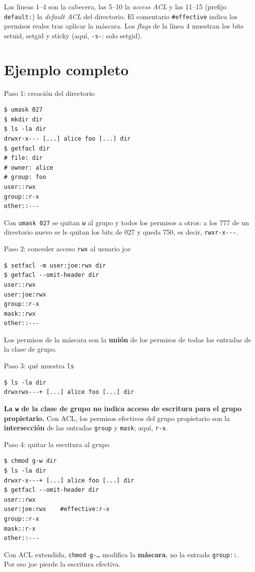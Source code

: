 \documentclass[11pt,a4paper]{report}
\newcommand{\destacar}[1]{\textcolor{red!70!black}{\textbf{#1}}}
\begin{document}
Las líneas 1--4 son la cabecera, las 5--10 la \emph{access ACL} y las 11--15 (prefijo \texttt{default:}) la \emph{default ACL} del directorio. El comentario \texttt{\#effective} indica los permisos reales tras aplicar la máscara. Los \emph{flags} de la línea 4 muestran los bits setuid, setgid y sticky (aquí, \texttt{-s-}: solo setgid).
 
\section{Ejemplo completo}
 
\begin{ejemplo}{Paso 1: creación del directorio}
\begin{verbatim}
$ umask 027
$ mkdir dir
$ ls -la dir
drwxr-x--- [...] alice foo [...] dir
$ getfacl dir
# file: dir
# owner: alice
# group: foo
user::rwx
group::r-x
other::---
\end{verbatim}
Con \texttt{umask 027} se quitan \texttt{w} al grupo y todos los permisos a otros: a los 777 de un directorio nuevo se le quitan los bits de 027 y queda 750, es decir, \texttt{rwxr-x-{}-{}-}.
\end{ejemplo}
 
\begin{ejemplo}{Paso 2: conceder acceso \texttt{rwx} al usuario joe}
\begin{verbatim}
$ setfacl -m user:joe:rwx dir
$ getfacl --omit-header dir
user::rwx
user:joe:rwx
group::r-x
mask::rwx
other::---
\end{verbatim}
Los permisos de la máscara son la \textbf{unión} de los permisos de todas las entradas de la clase de grupo.
\end{ejemplo}
 
\begin{ejemplo}{Paso 3: qué muestra \texttt{ls}}
\begin{verbatim}
$ ls -la dir
drwxrwx---+ [...] alice foo [...] dir
\end{verbatim}
\destacar{La \texttt{w} de la clase de grupo no indica acceso de escritura para el grupo propietario.} Con ACL, los permisos efectivos del grupo propietario son la \textbf{intersección} de las entradas \texttt{group} y \texttt{mask}; aquí, \texttt{r-x}.
\end{ejemplo}
 
\begin{ejemplo}{Paso 4: quitar la escritura al grupo}
\begin{verbatim}
$ chmod g-w dir
$ ls -la dir
drwxr-x---+ [...] alice foo [...] dir
$ getfacl --omit-header dir
user::rwx
user:joe:rwx    #effective:r-x
group::r-x
mask::r-x
other::---
\end{verbatim}
Con ACL extendida, \texttt{chmod g-\ldots} modifica la \textbf{máscara}, no la entrada \texttt{group::}. Por eso joe pierde la escritura efectiva.
\end{ejemplo}
 
\end{document}
